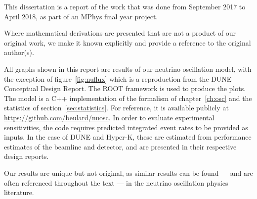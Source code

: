 %
%        
%        

This dissertation is a report of the work that was done from September 2017 to
April 2018, as part of an MPhys final year project.

Where mathematical derivations are presented that are not a product of our
original work, we make it known explicitly and provide a reference to the
original author(s).


All graphs shown in this report are results of our neutrino oscillation
model, with the exception of figure~\ref{fig:nuflux} which is a reproduction
from the DUNE Conceptual Design Report\cite{cdr}. The ROOT framework\cite{ROOT}
is used to produce the plots.
The model is a C++ implementation of the formalism of chapter~\ref{ch:osc} and
the statistics of section~\ref{sec:statistics}. For
reference, it is available publicly at
\href{url}{https://github.com/beulard/nuosc}.
In order to evaluate experimental sensitivities, the code requires predicted
integrated event rates to be provided as inputs. In the case of DUNE and Hyper-K,
these are estimated from performance estimates of the beamline and detector,
and are presented in their respective design reports\cite{cdr, hyperk}.

Our results are unique but not original, as similar results can be found ---
and are often referenced throughout the text --- in the neutrino oscillation
physics literature.


